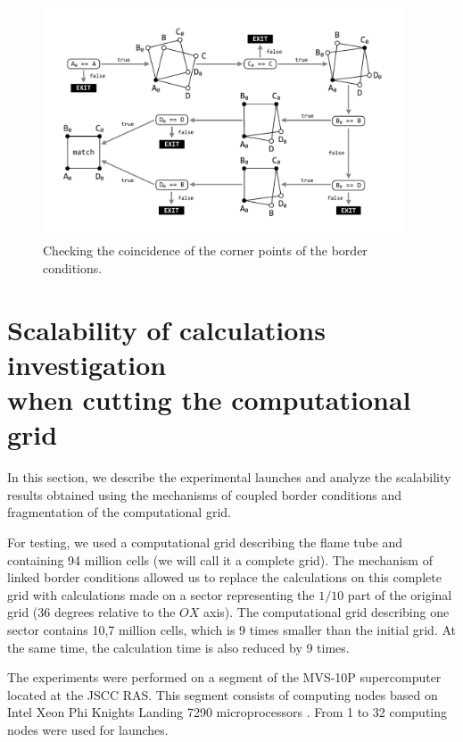 \documentclass[
11pt,%
tightenlines,%
twoside,%
onecolumn,%
nofloats,%
nobibnotes,%
nofootinbib,%
superscriptaddress,%
noshowpacs,%
centertags]%
{revtex4}
\begin{document}
\begin{figure}[h]
\setcaptionmargin{5mm}
\onelinecaptionstrue
\includegraphics[width=0.95\textwidth]{pics/match2.pdf}
\caption{Checking the coincidence of the corner points of the border conditions.}
\label{fig:match2}
\end{figure}

\section{Scalability of calculations investigation \protect\\ when cutting the computational grid}

In this section, we describe the experimental launches and analyze the scalability results obtained using the mechanisms of coupled border conditions and fragmentation of the computational grid.

For testing, we used a computational grid describing the flame tube and containing 94 million cells (we will call it a complete grid).
The mechanism of linked border conditions allowed us to replace the calculations on this complete grid with calculations made on a sector representing the $1/10$ part of the original grid (36 degrees relative to the $OX$ axis).
The computational grid describing one sector contains 10,7 million cells, which is 9 times smaller than the initial grid.
At the same time, the calculation time is also reduced by 9 times.

The experiments were performed on a segment of the MVS-10P supercomputer located at the JSCC RAS.
This segment consists of computing nodes based on Intel Xeon Phi Knights Landing 7290 microprocessors \cite{Jeffers_KNL}.
From 1 to 32 computing nodes were used for launches.
\end{document}
